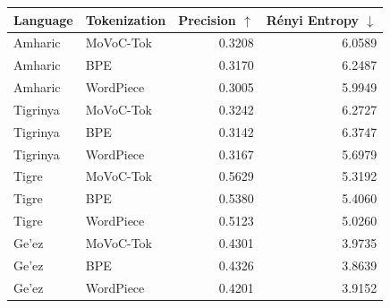 \begin{tabular}{llrr}
\hline
Language & Tokenization & Precision $\uparrow$ & R\'enyi Entropy $\downarrow$ \\
\hline
Amharic & MoVoC-Tok & 0.3208 & 6.0589 \\
Amharic & BPE & 0.3170 & 6.2487 \\
Amharic & WordPiece & 0.3005 & 5.9949 \\
Tigrinya & MoVoC-Tok & 0.3242 & 6.2727 \\
Tigrinya & BPE & 0.3142 & 6.3747 \\
Tigrinya & WordPiece & 0.3167 & 5.6979 \\
Tigre & MoVoC-Tok & 0.5629 & 5.3192 \\
Tigre & BPE & 0.5380 & 5.4060 \\
Tigre & WordPiece & 0.5123 & 5.0260 \\
Ge'ez & MoVoC-Tok & 0.4301 & 3.9735 \\
Ge'ez & BPE & 0.4326 & 3.8639 \\
Ge'ez & WordPiece & 0.4201 & 3.9152 \\
\hline
\end{tabular}
